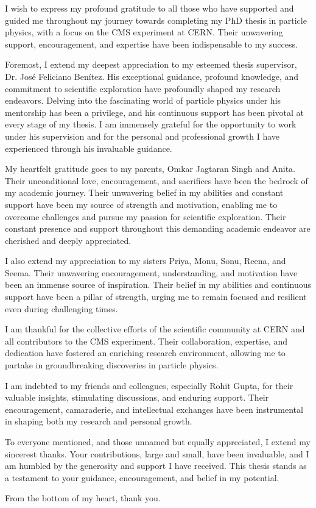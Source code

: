 I wish to express my profound gratitude to all those who have supported and guided me throughout my journey towards completing my PhD thesis in particle physics, with a focus on the CMS experiment at CERN. Their unwavering support, encouragement, and expertise have been indispensable to my success.

Foremost, I extend my deepest appreciation to my esteemed thesis supervisor, Dr. José Feliciano Benítez. His exceptional guidance, profound knowledge, and commitment to scientific exploration have profoundly shaped my research endeavors. Delving into the fascinating world of particle physics under his mentorship has been a privilege, and his continuous support has been pivotal at every stage of my thesis. I am immensely grateful for the opportunity to work under his supervision and for the personal and professional growth I have experienced through his invaluable guidance.

My heartfelt gratitude goes to my parents, Omkar Jagtaran Singh and Anita. Their unconditional love, encouragement, and sacrifices have been the bedrock of my academic journey. Their unwavering belief in my abilities and constant support have been my source of strength and motivation, enabling me to overcome challenges and pursue my passion for scientific exploration. Their constant presence and support throughout this demanding academic endeavor are cherished and deeply appreciated.

I also extend my appreciation to my sisters Priya, Monu, Sonu, Reena, and Seema. Their unwavering encouragement, understanding, and motivation have been an immense source of inspiration. Their belief in my abilities and continuous support have been a pillar of strength, urging me to remain focused and resilient even during challenging times.

I am thankful for the collective efforts of the scientific community at CERN and all contributors to the CMS experiment. Their collaboration, expertise, and dedication have fostered an enriching research environment, allowing me to partake in groundbreaking discoveries in particle physics.

I am indebted to my friends and colleagues, especially Rohit Gupta, for their valuable insights, stimulating discussions, and enduring support. Their encouragement, camaraderie, and intellectual exchanges have been instrumental in shaping both my research and personal growth.

To everyone mentioned, and those unnamed but equally appreciated, I extend my sincerest thanks. Your contributions, large and small, have been invaluable, and I am humbled by the generosity and support I have received. This thesis stands as a testament to your guidance, encouragement, and belief in my potential.

From the bottom of my heart, thank you.




























